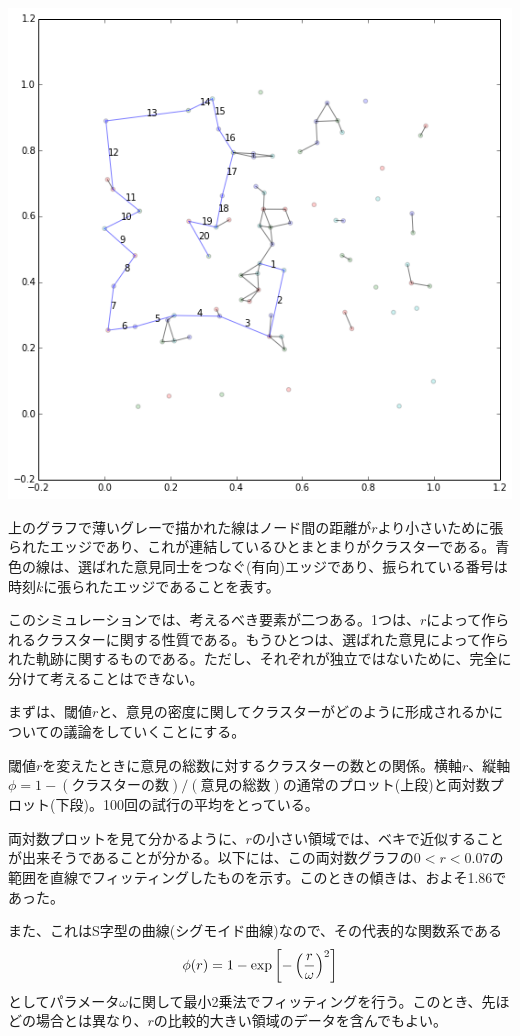 \documentclass[letterpaper,10pt,english]{sphinxmanual}
\begin{document}
\includegraphics{output_79_0.png}

上のグラフで薄いグレーで描かれた線はノード間の距離が\(r\)より小さいために張られたエッジであり、これが連結しているひとまとまりがクラスターである。青色の線は、選ばれた意見同士をつなぐ(有向)エッジであり、振られている番号は時刻\(k\)に張られたエッジであることを表す。

このシミュレーションでは、考えるべき要素が二つある。1つは、\(r\)によって作られるクラスターに関する性質である。もうひとつは、選ばれた意見によって作られた軌跡に関するものである。ただし、それぞれが独立ではないために、完全に分けて考えることはできない。

まずは、閾値\(r\)と、意見の密度に関してクラスターがどのように形成されるかについての議論をしていくことにする。

閾値\(r\)を変えたときに意見の総数に対するクラスターの数との関係。横軸\(r\)、縦軸\(\phi = 1- (\text{クラスターの数})/(\text{意見の総数})\)の通常のプロット(上段)と両対数プロット(下段)。100回の試行の平均をとっている。

両対数プロットを見て分かるように、\(r\)の小さい領域では、ベキで近似することが出来そうであることが分かる。以下には、この両対数グラフの\(0<r<0.07\)の範囲を直線でフィッティングしたものを示す。このときの傾きは、およそ1.86であった。

また、これはS字型の曲線(シグモイド曲線)なので、その代表的な関数系である
\begin{gather}
\begin{split}\phi (r) = 1 - \exp \left[ -  \left( \frac{r}{\omega} \right)^{2} \right]\end{split}\notag
\end{gather}
としてパラメータ\(\omega\)に関して最小2乗法でフィッティングを行う。このとき、先ほどの場合とは異なり、\(r\)の比較的大きい領域のデータを含んでもよい。
\end{document}
